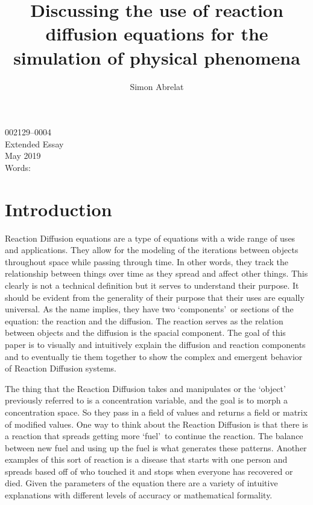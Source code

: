 \documentclass[12pt, letterpaper]{article}
\title{Discussing the use of reaction diffusion equations for the simulation of physical phenomena}
\author{Simon Abrelat}
\date{\vspace{-5ex}}
\newcommand{\sorta}[1]{\lq #1\rq \,}
\begin{document}
\large
{\fontsize{12}{14.4}
  {\singlespace{}
  \maketitle
  \begin{center}
  \vspace{4mm}
  002129--0004 \\
  \vspace{4mm}
  Extended Essay \\
  \vspace{4mm}
  May 2019 \\
  \vspace{4mm}
  Words: \\
  \end{center}
  }
}
\newpage

\newpage
\tableofcontents
\newpage 

\section{Introduction} \label{introduction}
Reaction Diffusion equations are a type of equations with a wide range of uses and applications. They allow
for the modeling of the iterations between objects throughout space while passing through time. In other
words, they track the relationship between things over time as they spread and affect other things. This
clearly is not a technical definition but it serves to understand their purpose. It should be evident from 
the generality of their purpose that their uses are equally universal. As the name implies, they have two
\sorta{components} or sections of the equation: the reaction and the diffusion. The reaction serves as the 
relation between objects and the diffusion is the spacial component. The goal of this paper is to visually
and intuitively explain the diffusion and reaction components and to eventually tie them together to show the
complex and emergent behavior of Reaction Diffusion systems.


The thing that the Reaction Diffusion takes and manipulates or the \sorta{object} previously referred to is a
concentration variable, and the goal is to morph a concentration space. So they pass in a field of values and
returns a field or matrix of modified values. One way to think about the Reaction Diffusion is that there is
a reaction that spreads getting more \sorta{fuel} to continue the reaction. The balance between new fuel and
using up the fuel is what generates these patterns. Another examples of this sort of reaction is a
disease that starts with one person and spreads based off of who touched it and stops when everyone has
recovered or died. Given the parameters of the equation there are a variety of intuitive explanations with
different levels of accuracy or mathematical formality. 
\end{document}
